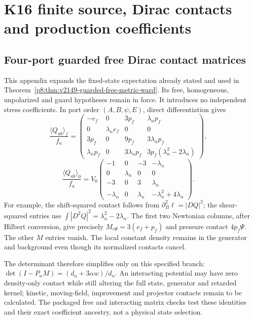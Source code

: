 \documentclass[12pt,a4paper]{article}
\begin{document}





\section{K16 finite source, Dirac contacts and production coefficients}
\label{p6c:sec:c3}
\subsection{Four-port guarded free Dirac contact matrices}
\label{p8:app:v2149-free-contact-matrices}
This appendix expands the fixed-state expectation already stated and used
in Theorem~\ref{p8:thm:v2149-guarded-free-metric-ward}. Its free,
homogeneous, unpolarized and guard hypotheses remain in force.
It introduces no independent stress coefficients.
In port order $(A,B,\psi,E)$, direct differentiation gives
\[
 \frac{\langle Q_{ab}\rangle_f}{f_a}=
 \begin{pmatrix}
 -e_f&0&3p_f&\lambda_np_f\\
 0&\lambda_ne_f&0&0\\
 3p_f&0&9p_f&3\lambda_np_f\\
 \lambda_np_f&0&3\lambda_np_f&3p_f(\lambda_n^2-2\lambda_n)
 \end{pmatrix},
\]
\[
 \frac{\langle Q_{ab}\rangle_0}{f_a}=V_0
 \begin{pmatrix}
 -1&0&-3&-\lambda_n\\
 0&\lambda_n&0&0\\
 -3&0&3&\lambda_n\\
 -\lambda_n&0&\lambda_n&-\lambda_n^2+4\lambda_n
 \end{pmatrix}.
\]
For example, the shift-squared contact follows from
$\partial_B^2\ell=|DQ|^2$; the shear-squared entries use
$\int|D^2Q|^2=\lambda_n^2-2\lambda_n$.
The first two Newtonian columns, after Hilbert conversion, give precisely
$M_{r\Psi}=3(e_f+p_f)$ and pressure contact $4p_f\Psi$.
The other $M$ entries vanish. The local constant density remains in the
generator and background even though its normalized contacts cancel.

The determinant therefore simplifies only on this specified branch:
$\det(I-P_nM)=(d_n+3\alpha w)/d_n$.
An interacting potential may have zero density-only contact while still
altering the full state, generator and retarded kernel; kinetic,
moving-field, improvement and projector contacts remain to be calculated.
The packaged free and interacting matrix checks test these identities
and their exact coefficient ancestry, not a physical state selection.
\end{document}

